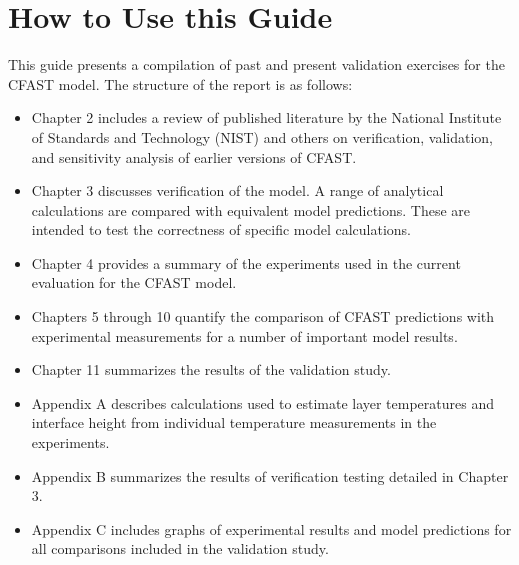 \section{How to Use this Guide}

This guide presents a compilation of past and present validation exercises for the CFAST model.  The structure of the report is as follows:

\begin{itemize}
\item Chapter 2 includes a review of published literature by the National Institute of Standards and Technology (NIST) and others on verification, validation, and sensitivity analysis of earlier versions of CFAST.
\item Chapter 3 discusses verification of the model.  A range of analytical calculations are compared with equivalent model predictions. These are intended to test the correctness of specific model calculations.
\item Chapter 4 provides a summary of the experiments used in the current evaluation for the CFAST model.
\item Chapters 5 through 10 quantify the comparison of CFAST predictions with experimental measurements for a number of important model results.
\item Chapter 11 summarizes the results of the validation study.
\item Appendix A describes calculations used to estimate layer temperatures and interface height from individual temperature measurements in the experiments.
\item Appendix B summarizes the results of verification testing detailed in Chapter 3.
\item Appendix C includes graphs of experimental results and model predictions for all comparisons included in the validation study.
\end{itemize}


